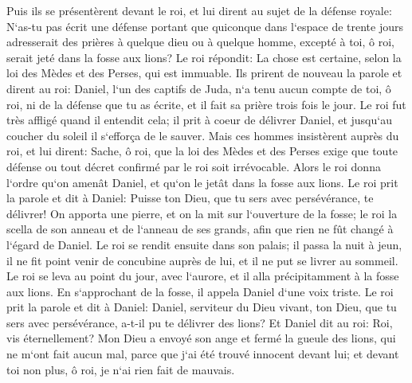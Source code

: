 \verse Puis ils se présentèrent devant le roi, et lui dirent au sujet de la défense royale: N`as-tu pas écrit une défense portant que quiconque dans l`espace de trente jours adresserait des prières à quelque dieu ou à quelque homme, excepté à toi, ô roi, serait jeté dans la fosse aux lions? Le roi répondit: La chose est certaine, selon la loi des Mèdes et des Perses, qui est immuable. 
\verse Ils prirent de nouveau la parole et dirent au roi: Daniel, l`un des captifs de Juda, n`a tenu aucun compte de toi, ô roi, ni de la défense que tu as écrite, et il fait sa prière trois fois le jour. 
\verse Le roi fut très affligé quand il entendit cela; il prit à coeur de délivrer Daniel, et jusqu`au coucher du soleil il s`efforça de le sauver. 
\verse Mais ces hommes insistèrent auprès du roi, et lui dirent: Sache, ô roi, que la loi des Mèdes et des Perses exige que toute défense ou tout décret confirmé par le roi soit irrévocable. 
\verse Alors le roi donna l`ordre qu`on amenât Daniel, et qu`on le jetât dans la fosse aux lions. Le roi prit la parole et dit à Daniel: Puisse ton Dieu, que tu sers avec persévérance, te délivrer! 
\verse On apporta une pierre, et on la mit sur l`ouverture de la fosse; le roi la scella de son anneau et de l`anneau de ses grands, afin que rien ne fût changé à l`égard de Daniel. 
\verse Le roi se rendit ensuite dans son palais; il passa la nuit à jeun, il ne fit point venir de concubine auprès de lui, et il ne put se livrer au sommeil. 
\verse Le roi se leva au point du jour, avec l`aurore, et il alla précipitamment à la fosse aux lions. 
\verse En s`approchant de la fosse, il appela Daniel d`une voix triste. Le roi prit la parole et dit à Daniel: Daniel, serviteur du Dieu vivant, ton Dieu, que tu sers avec persévérance, a-t-il pu te délivrer des lions? 
\verse Et Daniel dit au roi: Roi, vis éternellement? 
\verse Mon Dieu a envoyé son ange et fermé la gueule des lions, qui ne m`ont fait aucun mal, parce que j`ai été trouvé innocent devant lui; et devant toi non plus, ô roi, je n`ai rien fait de mauvais. 
